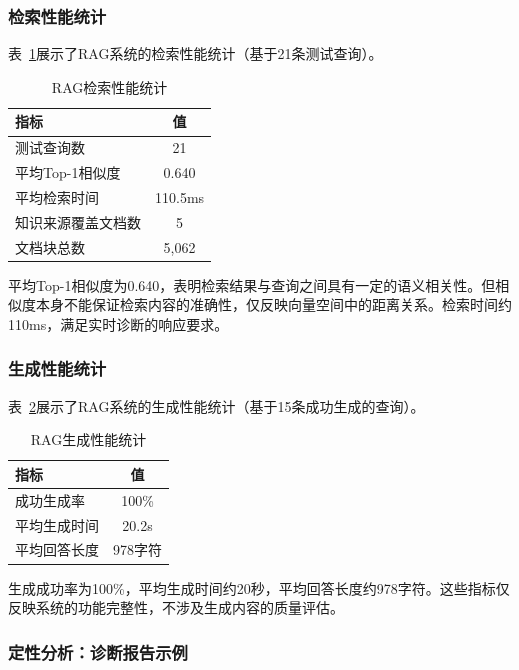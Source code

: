 \documentclass[12pt, a4paper]{article}
\begin{document}
\subsubsection{检索性能统计}

表~\ref{tab:rag_retrieval}展示了RAG系统的检索性能统计（基于21条测试查询）。

\begin{table}[H]
\centering
\caption{RAG检索性能统计}
\label{tab:rag_retrieval}
\begin{tabular}{lc}
\toprule
指标 & 值 \\
\midrule
测试查询数 & 21 \\
平均Top-1相似度 & 0.640 \\
平均检索时间 & 110.5ms \\
知识来源覆盖文档数 & 5 \\
文档块总数 & 5,062 \\
\bottomrule
\end{tabular}
\end{table}

平均Top-1相似度为0.640，表明检索结果与查询之间具有一定的语义相关性。但相似度本身不能保证检索内容的准确性，仅反映向量空间中的距离关系。检索时间约110ms，满足实时诊断的响应要求。

\subsubsection{生成性能统计}

表~\ref{tab:rag_generation}展示了RAG系统的生成性能统计（基于15条成功生成的查询）。

\begin{table}[H]
\centering
\caption{RAG生成性能统计}
\label{tab:rag_generation}
\begin{tabular}{lc}
\toprule
指标 & 值 \\
\midrule
成功生成率 & 100\% \\
平均生成时间 & 20.2s \\
平均回答长度 & 978字符 \\
\bottomrule
\end{tabular}
\end{table}

生成成功率为100\%，平均生成时间约20秒，平均回答长度约978字符。这些指标仅反映系统的功能完整性，不涉及生成内容的质量评估。

\subsubsection{定性分析：诊断报告示例}
\end{document}
